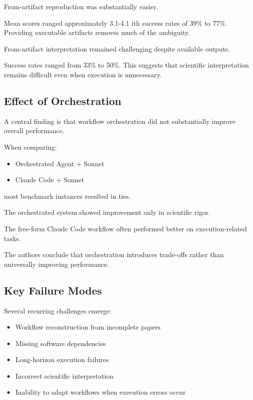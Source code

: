 \documentclass[11pt]{article}
\begin{document}
From-artifact reproduction was substantially easier.

Mean scores ranged approximately 3.1-4.1 ith success rates of 39\% to 77\%. Providing executable artifacts removes much of the ambiguity.

From-artifact interpretation remained challenging despite available outputs.

Success rates ranged from 33\% to 50\%. This suggests that scientific interpretation remains difficult even when execution is unnecessary.

\subsection*{Effect of Orchestration}

A central finding is that workflow orchestration did not substantially improve overall performance.

When comparing:

\begin{itemize}
    \item Orchestrated Agent + Sonnet
    \item Claude Code + Sonnet
\end{itemize}

most benchmark instances resulted in ties.

The orchestrated system showed improvement only in scientific rigor.

The free-form Claude Code workflow often performed better on execution-related tasks.

The authors conclude that orchestration introduces trade-offs rather than universally improving performance.

\subsection*{Key Failure Modes}

Several recurring challenges emerge:

\begin{itemize}
    \item Workflow reconstruction from incomplete papers
    \item Missing software dependencies
    \item Long-horizon execution failures
    \item Incorrect scientific interpretation
    \item Inability to adapt workflows when execution errors occur
\end{itemize}
\end{document}
